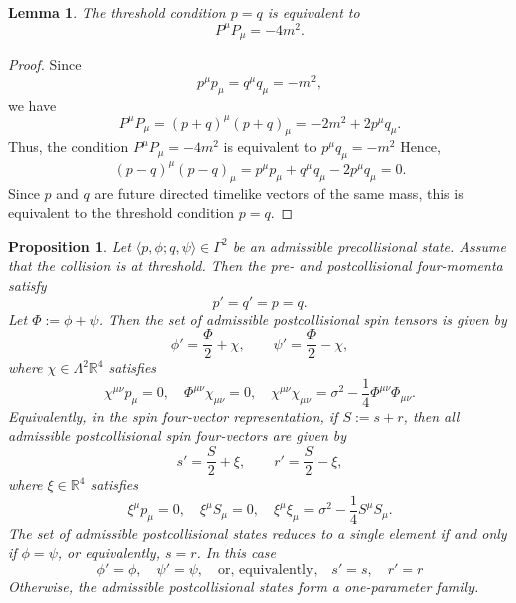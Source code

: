 \documentclass[12pt]{article}
\theoremstyle{plain}
\newtheorem{proposition}[theorem]{Proposition}
\newtheorem{lemma}[theorem]{Lemma}
\theoremstyle{definition}
\begin{document}
\begin{lemma}\label{simple}
The threshold condition $p=q$ is equivalent to
\[
P^\mu P_\mu=-4m^2.
\]
\end{lemma}
\begin{proof}
Since
\[
p^\mu p_\mu=q^\mu q_\mu=-m^2,
\]
we have
\[
P^\mu P_\mu=(p+q)^\mu(p+q)_\mu
=-2m^2+2p^\mu q_\mu.
\]
Thus, the condition $P^\mu P_\mu=-4m^2$ is equivalent to  $p^\mu q_\mu=-m^2$
Hence,
\[
(p-q)^\mu(p-q)_\mu
=
p^\mu p_\mu+q^\mu q_\mu-2p^\mu q_\mu
=0.
\]
Since $p$ and $q$ are future directed timelike vectors of the same mass, this is equivalent to the threshold condition $p=q$.
\end{proof}
\begin{proposition}\label{thresholdcase}
Let $\langle p,\phi;q,\psi\rangle\in\Gamma^2$ be an admissible precollisional state. 
Assume that the collision is at threshold.
Then the pre- and postcollisional four-momenta satisfy
\[
p'=q'=p=q.
\] 
Let $\Phi:=\phi+\psi$. 
Then the set of admissible postcollisional spin tensors is given by
\[
\phi'=\frac{\Phi}{2}+\chi,
\qquad
\psi'=\frac{\Phi}{2}-\chi,
\]
where $\chi\in\Lambda^2\mathbb R^4$ satisfies
\[
\chi^{\mu\nu}p_\mu=0,\quad 
\Phi^{\mu\nu}\chi_{\mu\nu}=0,
\quad
\chi^{\mu\nu}\chi_{\mu\nu}=\sigma^2-\frac14\Phi^{\mu\nu}\Phi_{\mu\nu}.
\]
Equivalently, in the spin four-vector representation, if $S:=s+r$,
then all admissible postcollisional spin four-vectors are given by
\[
s'=\frac{S}{2}+\xi,
\qquad
r'=\frac{S}{2}-\xi,
\]
where $\xi\in\mathbb R^4$ satisfies
\[
\xi^\mu p_\mu=0,\quad
\xi^\mu S_\mu=0,\quad 
\xi^\mu\xi_\mu=\sigma^2-\frac14 S^\mu S_\mu.
\]
The set of admissible postcollisional states reduces to a single element if and only if $\phi=\psi$,
or equivalently, $s=r$. In this case
\begin{equation}\label{physical}
\phi'=\phi,\quad \psi'=\psi,\quad\text{or, equivalently,}\quad
s'=s,\quad r'=r
\end{equation}
Otherwise, the admissible postcollisional states form a one-parameter family.
\end{proposition}
\end{document}
